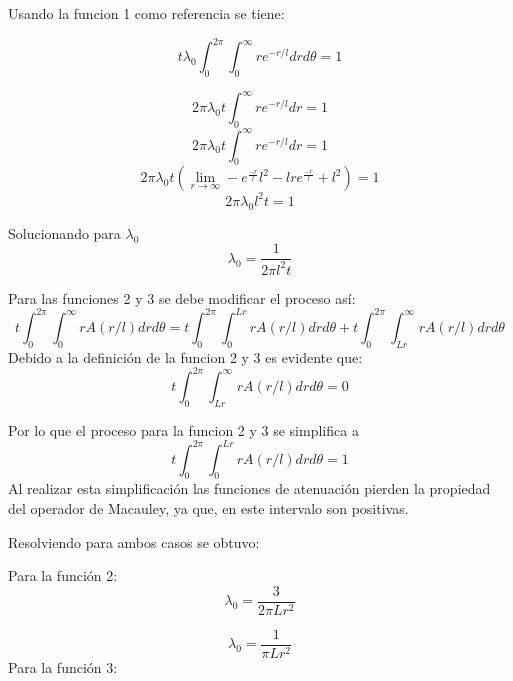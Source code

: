 Usando la funcion 1 como referencia se tiene:

\begin{equation}
	t\lambda_0\int_{0}^{2\pi}\int_{0}^{\infty}{re^{-r/l}}{dr}{d\theta}=1
\end{equation} 

\begin{equation}
	2\pi\lambda_0t\int_{0}^{\infty}{re^{-r/l}}{dr}=1
\end{equation}
\begin{equation}
	2\pi\lambda_0t\int_{0}^{\infty}{re^{-r/l}}{dr}=1
\end{equation} 
\begin{equation}
	2\pi\lambda_0t\left(\lim_{r\to\infty}-e^{\frac{-r}{l}}l^2-lre^{\frac{-r}{l}}+l^2\right)=1
\end{equation} 
\begin{equation}
	2\pi\lambda_0l^2t=1
\end{equation} 

Solucionando para $\lambda_0$
\begin{equation}
	\lambda_0=\frac{1}{2\pi l^2 t}
\end{equation} 

Para las funciones 2 y 3 se debe modificar el proceso así:
\begin{equation}
	t\int_{0}^{2\pi}\int_{0}^{\infty}{rA(r/l)}{dr}{d\theta}=t\int_{0}^{2\pi}\int_{0}^{Lr}{rA(r/l)}{dr}{d\theta}+t\int_{0}^{2\pi}\int_{Lr}^{\infty}{rA(r/l)}{dr}{d\theta}
\end{equation}
Debido a la definición de la funcion 2 y 3 es evidente que:
\begin{equation}
	t\int_{0}^{2\pi}\int_{Lr}^{\infty}{rA(r/l)}{dr}{d\theta}=0
\end{equation}

Por lo que el proceso para la funcion 2 y 3 se simplifica a
\begin{equation}
	t\int_{0}^{2\pi}\int_{0}^{Lr}{rA(r/l)}{dr}{d\theta}=1
\end{equation}
Al realizar esta simplificación las funciones de atenuación pierden la propiedad del operador de Macauley, ya que, en este intervalo son positivas.

Resolviendo para ambos casos se obtuvo:

Para la función 2:
\begin{equation}
	\lambda_0=\frac{3}{2\pi Lr^2}
\end{equation}

\begin{equation}
	\lambda_0=\frac{1}{\pi Lr^2}
\end{equation}
Para la función 3:

